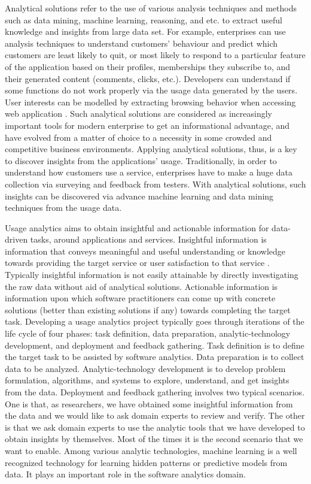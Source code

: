 Analytical solutions refer to the use of various analysis techniques and methods such as data mining, machine learning, reasoning, and etc. to extract useful knowledge and insights from large data set. For example, enterprises can use analysis techniques to understand customers' behaviour and predict which customers are least likely to quit, or most likely to respond to a particular feature of the application based on their profiles, memberships they subscribe to, and their generated content (comments, clicks, etc.). Developers can understand if some functions do not work properly via the usage data generated by the users. User interests can be modelled by extracting browsing behavior when accessing web application \cite{Gasparetti2016}. Such analytical solutions are considered as increasingly important tools for modern enterprise to get an informational advantage, and have evolved from a matter of choice to a necessity in some crowded and competitive business environments. Applying analytical solutions, thus, is a key to discover insights from the applications' usage. Traditionally, in order to understand how customers use a service, enterprises have to make a huge data collection via surveying and feedback from testers. With analytical solutions, such insights can be discovered via advance machine learning and data mining techniques from the usage data. 


Usage analytics aims to obtain insightful and actionable information for data-driven tasks, around applications and services. Insightful information is information that conveys meaningful and useful understanding or knowledge towards providing the target service or user satisfaction to that service \cite{Zhang2011}. Typically insightful information is not easily attainable by directly investigating the raw data without aid of analytical solutions. Actionable information is information upon which software practitioners can come up with concrete solutions (better than existing solutions if any) towards completing the target task. Developing a usage analytics project typically goes through iterations of the life cycle of four phases: task definition, data preparation, analytic-technology development, and deployment and feedback gathering. Task definition is to define the target task to be assisted by software analytics. Data preparation is to collect data to be analyzed. Analytic-technology development is to develop problem formulation, algorithms, and systems to explore, understand, and get insights from the data. Deployment and feedback gathering involves two typical scenarios. One is that, as researchers, we have obtained some insightful information from the data and we would like to ask domain experts to review and verify. The other is that we ask domain experts to use the analytic tools that we have developed to obtain insights by themselves. Most of the times it is the second scenario that we want to enable. Among various analytic technologies, machine learning is a well recognized technology for learning hidden patterns or predictive models from data. It plays an important role in the software analytics domain. 

